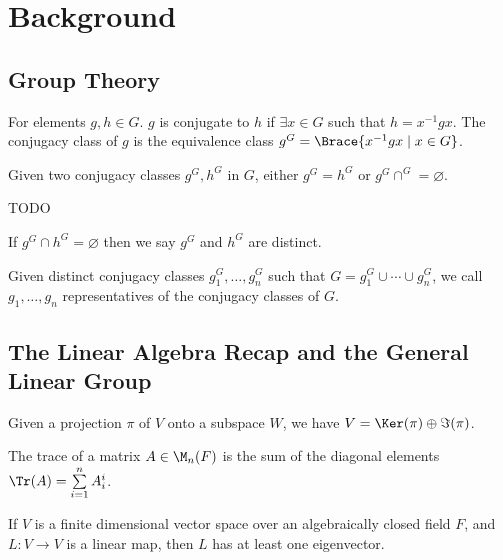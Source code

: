 \documentclass[../Project.tex]{subfiles}
\begin{document}
\newpage
\section{Background}
\subsection{Group Theory}
	\begin{defi}
		For elements $g,h \in G$. $g$ is conjugate to $h$ if $\exists x \in G$ such that $h = x^{-1}gx$. The conjugacy class of $g$ is the equivalence class $g^G = \Brace{x^{-1}gx \;\vert\; x \in G}$.
	\end{defi}

	\begin{prop}
		Given two conjugacy classes $g^G,h^G$ in $G$, either $g^G = h^G$ or $g^G \cap ^G = \varnothing$.
	\end{prop}
	\begin{proo*}
		TODO
	\end{proo*}
	\begin{defi}
		 If $g^G \cap h^G = \varnothing$ then we say $g^G$ and $h^G$ are distinct.
	\end{defi}
	\begin{defi}
		Given distinct conjugacy classes $g_1^G,\dots,g_n^G$ such that $G = g_1^G\cup \cdots \cup g^G_n$, we call $g_1,\dots,g_n$ representatives of the conjugacy classes of $G$.
	\end{defi}

\newpage
\subsection{The Linear Algebra Recap and the General Linear Group}

\begin{theo}
	Given a projection $\pi$ of $V$ onto a subspace $W$, we have $V = \Ker(\pi) \oplus \Im(\pi)$.
	\label{projtheo}
\end{theo}

\begin{defi}
	The trace of a matrix $A \in \M_n(F)$ is the sum of the diagonal elements $\Tr(A) = \sum\limits_{i = 1}^nA^i_i$.
\end{defi}

\begin{theo}
	If $V$ is a finite dimensional vector space over an algebraically closed field $F$, and $L : V \to V$ is a linear map, then $L$ has at least one eigenvector.
	\label{eigenvectheo}
\end{theo}
\end{document}
